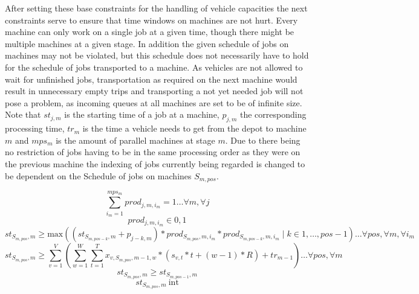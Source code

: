 After setting these base constraints for the handling of vehicle capacities the next constraints serve to ensure that time windows on machines are not hurt.
Every machine can only work on a single job at a given time, though there might be multiple machines at a given stage. In addition the given schedule of
jobs on machines may not be violated, but this schedule does not necessarily have to hold for the schedule of jobs transported to a machine. As vehicles
are not allowed to wait for unfinished jobs, transportation as required on the next machine would result in unnecessary
empty trips and transporting a not yet needed job will not pose a problem, as incoming queues at all machines are set to be of infinite size. Note that
\(st_{j,m}\) is the starting time of a job at a machine, \(p_{j,m}\) the corresponding processing time, \(tr_{m}\) is the time a vehicle needs to get from
the depot to machine \(m\) and \(mps_{m}\) is the amount of parallel machines at stage \(m\). Due to there being no restriction of jobs having to be in the
same processing order as they were on the previous machine the indexing of jobs currently being regarded is changed to be dependent on the Schedule of jobs
on machines \(S_{m,pos}\).

\begin{equation}
  \sum_{i_{m} = 1}^{mps_{m}}prod_{j,m,i_{m}} = 1 \ldots \forall m, \forall j
\end{equation}
\begin{equation}
  prod_{j,m,i_{m}} \in {0,1}
\end{equation}
\begin{equation}
 st_{S_{m,pos},m} \geq \mathrm{max}((st_{S_{m,pos-k}, m} + p_{j-k,m}) * prod_{S_{m,pos},m,i_{m}} * prod_{S_{m,pos-k},m,i_{m}}\mid k \in {1,\ldots,pos-1}) \ldots \forall pos, \forall m, \forall i_{m}
\end{equation}
\begin{equation}
 st_{S_{m,pos},m} \geq \sum_{v=1}^{V}(\sum_{w=1}^{W}\sum_{t=1}^{T} x_{v,S_{m,pos},m-1,w} * (s_{v,t} * t + (w-1) * R) + tr_{m-1}) \ldots \forall pos, \forall m
\end{equation}
\begin{equation}
  st_{S_{m,pos},m} \geq st_{S_{m,pos-1},m}
\end{equation}
\begin{equation}
  st_{S_{m,pos},m}\> \mathrm{int}
\end{equation}

